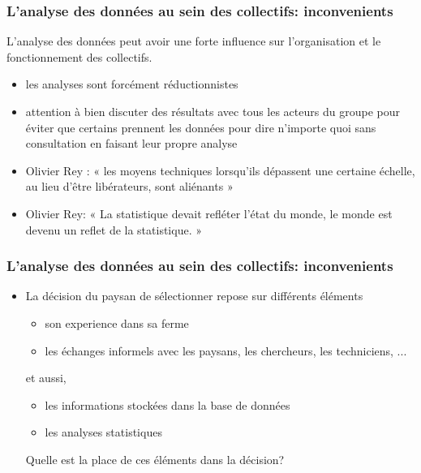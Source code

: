 \begin{frame}
\frametitle{L'analyse des données au sein des collectifs: inconvenients}

L'analyse des données peut avoir une forte influence sur l’organisation et le fonctionnement des collectifs.

\vfill

\begin{itemize}

\item les analyses sont forcément réductionnistes

\item attention à bien discuter des résultats avec tous les acteurs du groupe pour éviter que certains prennent les données pour dire n'importe quoi sans consultation en faisant leur propre analyse

\item Olivier Rey : « les moyens techniques lorsqu'ils dépassent une certaine échelle, au lieu d'être libérateurs, sont aliénants »

\item Olivier Rey: « La statistique devait refléter l’état du monde, le monde est devenu un reflet de la statistique. »

\end{itemize}

\end{frame}



\begin{frame}
\frametitle{L'analyse des données au sein des collectifs: inconvenients}

\begin{itemize}
\item La décision du paysan de sélectionner repose sur différents éléments

\begin{itemize}
\item son experience dans sa ferme
\item les échanges informels avec les paysans, les chercheurs, les techniciens, ...
\end{itemize}

et aussi,

\begin{itemize}
\item les informations stockées dans la base de données
\item les analyses statistiques
\end{itemize}

\begin{block}{}
\centering
Quelle est la place de ces éléments dans la décision?
\end{block}

\end{itemize}


\end{frame}


